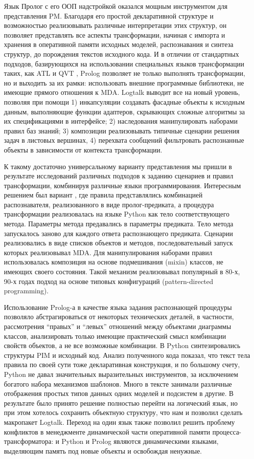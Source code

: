 \documentclass[12pt]{article}
\begin{document}
Язык Пролог с его ООП надстройкой оказался мощным инструментом для представления PM.  Благодаря его простой декларативной структуре и возможностью реализовывать различные интерпретации этих структур, он позволяет представлять все аспекты трансформации, начиная с импорта и хранения в оперативной памяти исходных моделей, распознавания и синтеза структур, до порождения текстов исходного кода.  И в отличии от стандартных подходов, базирующихся на использовании специальных языков трансформации таких, как ATL и QVT \cite{}, Prolog позволяет не только выполнять трансформации, но и выходить за их рамки: использовать внешние программные библиотеки, не имеющие прямого отношения к MDA.  Logtalk выводит все на новый уровень, позволяя при помощи 1) инкапсуляции создавать фасадные объекты к исходным данным, выполняющие функции адаптеров, скрывающих сложные алгоритмы за их спецификациями в интерфейсе; 2) наследования манипулировать наборами правил баз знаний; 3) композиции реализовывать типичные сценарии решения задач в листовых вершинах, 4) перехвата сообщений фильтровать распознанные объекты в зависимости от контекста трансформации.

К такому достаточно универсальному варианту представления мы пришли в результате исследований различных подходов к заданию сценариев и правил трансформации, комбинируя различные языки программирования.  Интересным решением был вариант \cite{}, где правила представлялись комбинацией распознавателя, реализованного в виде пролог-предиката, а процедура трансформации реализовалась на языке Python как тело соответствующего метода.  Параметры метода предавались в параметры предиката.  Тело метода запускалось заново для каждого ответа распознающего предиката.  Сценарии реализовались в виде списков объектов и методов, последовательный запуск которых реализовывал MDA.  Для манипулирования наборами правил использовалась композиция на основе подмешивания (mixin) классов, не имеющих своего состояния.  Такой механизм реализовывал популярный в 80-х, 90-х годах подход на основе типовых конфигураций \cite{bratko} (pattern-directed programming).

Использование Prolog-а в качестве языка задания распознающей процедуры позволяло абстрагироваться от некоторых технических деталей, в частности, рассмотрения ``правых'' и ``левых'' отношений между объектами диаграммы классов, анализировать только имеющие практический смысл комбинации свойств объектов, а не все возможные комбинации.  В Python синтезировались структуры PIM и исходный код.  Анализ полученного кода показал, что текст тела правила по своей сути тоже декларативная конструкция, и по большому счету, Python не давал значительных выразительных инструментов, за исключением богатого набора механизмов шаблонов.  Много в тексте занимали различные отображения простых типов данных одних моделей и подсистем в другие.  В результате было принято решение полностью перейти на логический язык, но при этом хотелось сохранить объектную структуру, что нам и позволил сделать макропакет Logtalk.  Переход на один язык также позволил решить проблему конфликтов в менеджменте динамической части оперативной памяти процесса-трансформатора: и Python и Prolog являются динамическими языками, выделяющим память под новые объекты и освобождая ненужные.
\end{document}
